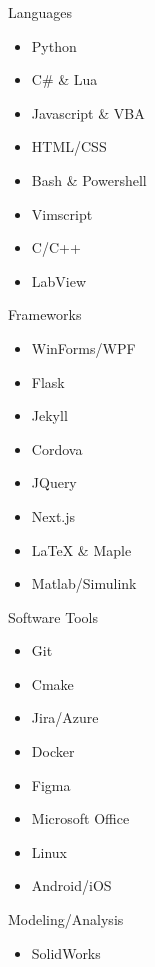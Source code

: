 \begin{minipage}{\dimexpr\textwidth-2ex}
\begin{multicols}{5}%
    {\color{cblue} Languages}
    \begin{itemize}[topsep=3pt,label=\textcolor{blue}{\textbullet},leftmargin=*]
        \itemsep-0.2em 
        \item Python
        \item C\# \& Lua
        \item Javascript \& VBA
        \item HTML/CSS
        \item Bash \& Powershell 
        \item Vimscript
        \item C/C++ 
        \item LabView
    \end{itemize}
    \columnbreak
    {\color{cblue} Frameworks}
    \begin{itemize}[topsep=3pt,label=\textcolor{blue}{\textbullet},leftmargin=*]
        \itemsep-0.2em 
        \item WinForms/WPF
        \item Flask
        \item Jekyll
        \item Cordova
        \item JQuery
        \item Next.js
        \item LaTeX \& Maple
        \item Matlab/Simulink
    \end{itemize}
    \columnbreak
    {\color{cblue} Software Tools}
    \begin{itemize}[topsep=3pt,label=\textcolor{blue}{\textbullet},leftmargin=*]
        \itemsep-0.2em 
        \item Git
        \item Cmake
        \item Jira/Azure
        \item Docker
        \item Figma
        \item Microsoft Office
        \item Linux
        \item Android/iOS
    \end{itemize}
    \columnbreak
    {\color{cblue} Modeling/Analysis}
    \begin{itemize}[topsep=3pt,label=\textcolor{blue}{\textbullet},leftmargin=*]
        \itemsep-0.2em 
        \item SolidWorks

\end{itemize}
\end{multicols}
\end{minipage}
